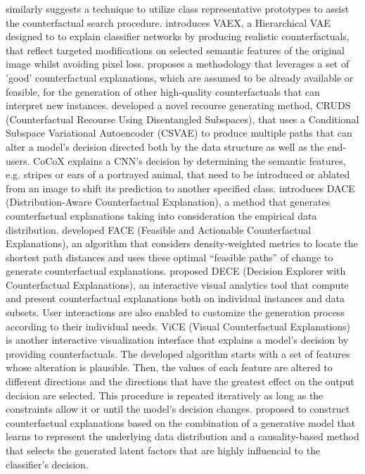 \documentclass[journal]{IEEEtran}
\begin{document}
\cite{VanLooveren2019} similarly suggests a technique to utilize class representative prototypes to assist the counterfactual search procedure.
\cite{Vercheval2021} introduces VAEX, a Hierarchical VAE designed to to explain classifier networks by producing realistic counterfactuals, that reflect targeted modifications on selected semantic features of the original image whilst avoiding pixel loss.
\cite{Keane2020} proposes a methodology that leverages a set of 'good' counterfactual explanations, which are assumed to be already available or feasible, for the generation of other high-quality counterfactuals that can interpret new instances.
\cite{Downs2020} developed a novel recourse generating method, CRUDS (Counterfactual Recourse Using Disentangled Subspaces), that uses a Conditional Subspace Variational Autoencoder (CSVAE) to produce multiple paths that can alter a model's decision directed both by the data structure as well as the end-users.
CoCoX \cite{Akula2020} explains a CNN's decision by determining the semantic features, e.g. stripes or ears of a portrayed animal, that need to be introduced or ablated from an image to shift its prediction to another specified class.
\cite{Kanamori2020b} introduces DACE (Distribution-Aware Counterfactual Explanation), a method that generates counterfactual explanations taking into consideration the empirical data distribution.
\cite{Poyiadzi2020} developed FACE (Feasible and Actionable Counterfactual Explanations), an algorithm that considers density-weighted metrics to locate the shortest path distances and uses these optimal  “feasible paths” of change to generate counterfactual explanations.
\cite{Cheng2021} proposed DECE (Decision Explorer with Counterfactual Explanations), an interactive visual analytics tool that compute and present counterfactual explanations both on individual instances and data subsets. User interactions are also enabled to customize the generation process according to their individual needs.
ViCE (Visual Counterfactual Explanations) \cite{Gomez2020} is another interactive visualization interface that explains a model's decision by providing counterfactuals. The developed algorithm starts with a set of features whose alteration is plausible. Then, the values of each feature are altered to different directions and the directions that have the greatest effect on the output decision are selected. This procedure is repeated iteratively as long as the constraints allow it or until the model's decision changes.
\cite{OShaughnessy2020} proposed to construct counterfactual explanations based on the combination of a generative model that learns to represent the underlying data distribution and a causality-based method that selects the generated latent factors that are highly influencial to the classifier's decision. 
\end{document}
